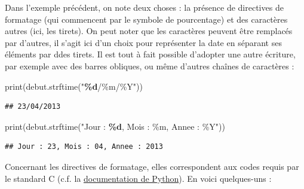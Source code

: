 \documentclass[
  12pt,
]{book}
\newenvironment{Shaded}{\begin{snugshade}}{\end{snugshade}}
\newcommand{\BuiltInTok}[1]{#1}
\newcommand{\NormalTok}[1]{#1}
\newcommand{\SpecialCharTok}[1]{\textcolor[rgb]{0.81,0.36,0.00}{\textbf{#1}}}
\newcommand{\StringTok}[1]{\textcolor[rgb]{0.31,0.60,0.02}{#1}}
\numberwithin{equation}{section}
\numberwithin{countremarque}{section}
\begin{document}
Dans l'exemple précédent, on note deux choses : la présence de directives de formatage (qui commencent par le symbole de pourcentage) et des caractères autres (ici, les tirets). On peut noter que les caractères peuvent être remplacés par d'autres, il s'agit ici d'un choix pour représenter la date en séparant ses éléments par ddes tirets. Il est tout à fait possible d'adopter une autre écriture, par exemple avec des barres obliques, ou même d'autres chaînes de caractères :

\begin{Shaded}
\begin{Highlighting}[]
\BuiltInTok{print}\NormalTok{(debut.strftime(}\StringTok{"}\SpecialCharTok{\%d}\StringTok{/\%m/\%Y"}\NormalTok{))}
\end{Highlighting}
\end{Shaded}

\begin{lstlisting}
## 23/04/2013
\end{lstlisting}

\begin{Shaded}
\begin{Highlighting}[]
\BuiltInTok{print}\NormalTok{(debut.strftime(}\StringTok{"Jour : }\SpecialCharTok{\%d}\StringTok{, Mois : \%m, Annee : \%Y"}\NormalTok{))}
\end{Highlighting}
\end{Shaded}

\begin{lstlisting}
## Jour : 23, Mois : 04, Annee : 2013
\end{lstlisting}

Concernant les directives de formatage, elles correspondent aux codes requis par le standard C (c.f. la \href{https://docs.python.org/fr/3/library/datetime.html\#strftime-strptime-behavior}{documentation de Python}). En voici quelques-uns :
\end{document}
